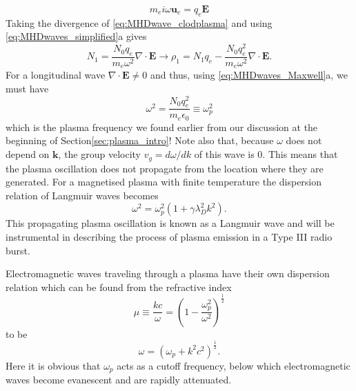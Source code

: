 \begin{equation}
\label{eq:MHDwave_clodplasma}
m_e i \omega \mathbf{u}_e = q_e \mathbf{E}
\end{equation}
Taking the divergence of \ref{eq:MHDwave_clodplasma} and using \ref{eq:MHDwaves_simplified}a gives
\begin{equation}
N_1 = \frac{N_0 q_e}{m_e \omega^2} \nabla \cdot \mathbf{E} \rightarrow \rho_1 = N_1 q_e - \frac{N_0 q_e^2}{m_e \omega^2} \nabla \cdot \mathbf{E}.
\end{equation}
For a longitudinal wave $\nabla \cdot \mathbf{E} \neq 0$ and thus, using \ref{eq:MHDwaves_Maxwell}a, we must have
\begin{equation}
\label{eq:MHDwave_plasmafreq}
\omega^2 = \frac{N_0 q_e^2}{m_e \epsilon_0} \equiv \omega^2_{p}
\end{equation}
which is the plasma frequency we found earlier from our discussion at the beginning of Section\ref{sec:plasma_intro}! Note also that, because $\omega$ does not depend on $\mathbf{k}$, the group velocity $v_g = d\omega / d k$ of this wave is 0. This means that the plasma oscillation does not propagate from the location where they are generated. For a magnetised plasma with finite temperature the dispersion relation of Langmuir waves becomes 
\begin{equation}
\label{eq:MHDwave_langmuir}
\omega^2 = \omega_p^2(1 + \gamma \lambda_D^2k^2).
\end{equation}
This propagating plasma oscillation is known as a Langmuir wave and will be instrumental in describing the process of plasma emission in a Type III radio burst.

Electromagnetic waves traveling through a plasma have their own dispersion relation which can be found from the refractive index
\begin{equation}
\mu \equiv \frac{kc}{\omega} = (1 - \frac{\omega_p^2}{\omega^2})^{\frac{1}{2}}
\end{equation}
to be
\begin{equation}
\label{eq:MHDwave_emdispersion}
\omega = (\omega_p +k^2 c^2)^\frac{1}{2}.
\end{equation}
Here it is obvious that $\omega_p$ acts as a cutoff frequency, below which electromagnetic waves become evanescent and are rapidly attenuated.
